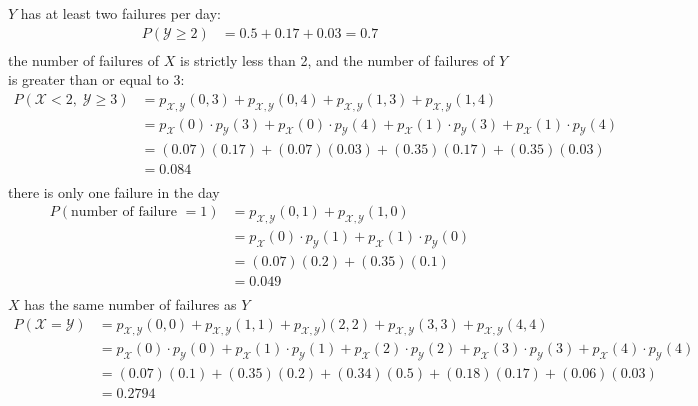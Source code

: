 \documentclass[12pt,border=4pt,multi]{article} %
\begin{document}
$Y$ has at least two failures per day:
\begin{align*}
P(\mathcal{Y} \geq 2) &= 0.5 + 0.17 + 0.03 = \boxed{0.7}\\
\end{align*}
the number of failures of $X$ is strictly less than 2, and the number of failures of $Y$ is greater than or equal to 3:
\begin{align*}
P(\mathcal{X} < 2,\; \mathcal{Y} \geq 3) &= p_{\mathcal{X}, \mathcal{Y}}(0, 3) + p_{\mathcal{X}, \mathcal{Y}}(0, 4) + p_{\mathcal{X}, \mathcal{Y}}(1, 3) + p_{\mathcal{X}, \mathcal{Y}}(1, 4)\\
&= p_{\mathcal{X}}(0) \cdot p_{\mathcal{Y}}(3) + p_{\mathcal{X}}(0) \cdot p_{\mathcal{Y}}(4) + p_{\mathcal{X}}(1) \cdot p_{\mathcal{Y}}(3) + p_{\mathcal{X}}(1) \cdot p_{\mathcal{Y}}(4)\\
&= (0.07)(0.17) + (0.07)(0.03) + (0.35)(0.17) + (0.35)(0.03)\\
&= \boxed{0.084}\\
\end{align*}
there is only one failure in the day
\begin{align*}
P(\text{number of failure } = 1) &= p_{\mathcal{X}, \mathcal{Y}}(0, 1) + p_{\mathcal{X}, \mathcal{Y}}(1, 0)\\
&= p_{\mathcal{X}}(0) \cdot p_{\mathcal{Y}}(1) + p_{\mathcal{X}}(1) \cdot p_{\mathcal{Y}}(0)\\
&= (0.07)(0.2) + (0.35)(0.1)\\
&= \boxed{0.049}\\
\end{align*}
$X$ has the same number of failures as $Y$
\begin{align*}
P(\mathcal{X} = \mathcal{Y}) &= p_{\mathcal{X}, \mathcal{Y}}(0, 0) + p_{\mathcal{X}, \mathcal{Y}}(1, 1) + p_{\mathcal{X}, \mathcal{Y}})(2, 2) + p_{\mathcal{X}, \mathcal{Y}}(3, 3) + p_{\mathcal{X}, \mathcal{Y}}(4, 4)\\
&= p_{\mathcal{X}}(0) \cdot p_{\mathcal{Y}}(0) + p_{\mathcal{X}}(1) \cdot p_{\mathcal{Y}}(1) + p_{\mathcal{X}}(2) \cdot p_{\mathcal{Y}}(2) + p_{\mathcal{X}}(3) \cdot p_{\mathcal{Y}}(3) + p_{\mathcal{X}}(4) \cdot p_{\mathcal{Y}}(4)\\
&= (0.07)(0.1) + (0.35)(0.2) + (0.34)(0.5) + (0.18)(0.17) + (0.06)(0.03)\\
&= \boxed{0.2794}\\
\end{align*}
\\
\\
\\
\end{document}
